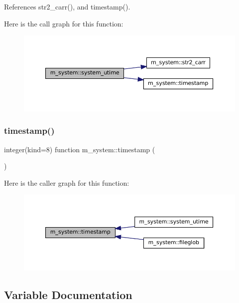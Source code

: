 References str2\+\_\+carr(), and timestamp().

Here is the call graph for this function\+:\nopagebreak
\begin{figure}[H]
\begin{center}
\leavevmode
\includegraphics[width=350pt]{namespacem__system_a83a121ba0b525210b5217565569ef350_cgraph}
\end{center}
\end{figure}
\mbox{\label{namespacem__system_a635baf5850927faa97461afaca512235}} 
\subsubsection{\texorpdfstring{timestamp()}{timestamp()}}
{\footnotesize\ttfamily integer(kind=8) function m\+\_\+system\+::timestamp (\begin{DoxyParamCaption}{ }\end{DoxyParamCaption})\hspace{0.3cm}{\ttfamily [private]}}

Here is the caller graph for this function\+:\nopagebreak
\begin{figure}[H]
\begin{center}
\leavevmode
\includegraphics[width=350pt]{namespacem__system_a635baf5850927faa97461afaca512235_icgraph}
\end{center}
\end{figure}


\subsection{Variable Documentation}
\mbox{\label{namespacem__system_a82a13cb7ac2c5f0e6e34fc3cfc010d42}} 
